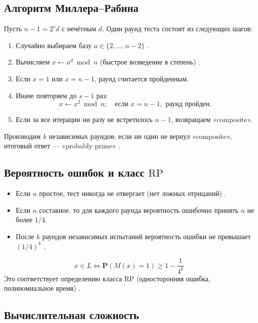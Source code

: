 \documentclass[a4paper,12pt]{article}
\begin{document}
\subsection{Алгоритм Миллера–Рабина}

Пусть \(n-1 = 2^s d\) с нечётным \(d\). Один раунд теста состоит из следующих шагов:

\begin{enumerate}
  \item Случайно выбираем базу \(a\in\{2,\dots,n-2\}\) \cite{WikipediaMR}.
  \item Вычисляем \(x \gets a^d \bmod n\) (быстрое возведение в степень) \cite{WikipediaMR}.
  \item Если \(x = 1\) или \(x = n-1\), раунд считается пройденным.
  \item Иначе повторяем до \(s-1\) раз:
    \[
      x \gets x^2 \bmod n;
      \quad
      \text{если }x = n-1,\text{ раунд пройден.}
    \]
  \item Если за все итерации ни разу не встретилось \(n-1\), возвращаем «composite».
\end{enumerate}

Производим \(k\) независимых раундов; если ни один не вернул «composite», итоговый ответ — «probably prime» \cite{CornellMR}.

\subsection{Вероятность ошибок и класс \(\mathrm{RP}\)}

\begin{itemize}
  \item Если \(n\) простое, тест никогда не отвергает (нет ложных отрицаний) \cite{ANUPrimality}.
  \item Если \(n\) составное, то для каждого раунда вероятность ошибочно принять \(n\) не более \(1/4\).
  \item После \(k\) раундов независимых испытаний вероятность ошибки не превышает \((1/4)^k\) \cite{MathSE}.
\end{itemize}
\[x\in L\iff \mathbf{P}(M(x)=1)\geq1-\frac{1}{4^k}\]
Это соответствует определению класса \(\mathrm{RP}\) (односторонняя ошибка, полиномиальное время) \cite{RPWiki}\cite{CMUHandout}.

\subsection{Вычислительная сложность}
\end{document}
